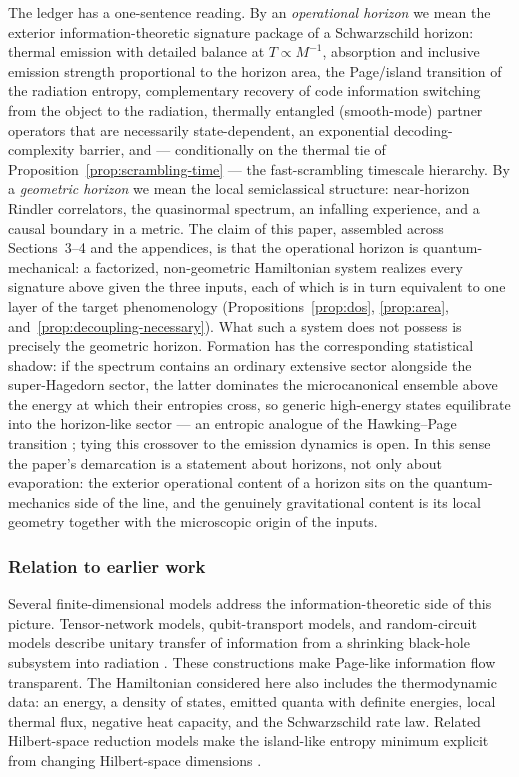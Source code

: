 \documentclass[12pt]{article}
\begin{document}
The ledger has a one-sentence reading.  By an \emph{operational horizon}
we mean the exterior information-theoretic signature package of a
Schwarzschild horizon: thermal emission with detailed balance at
$T\propto M^{-1}$, absorption and inclusive emission strength
proportional to the horizon area, the Page/island transition of the
radiation entropy, complementary recovery of code information switching
from the object to the radiation, thermally entangled (smooth-mode)
partner operators that are necessarily state-dependent, an exponential
decoding-complexity barrier, and --- conditionally on the thermal tie of
Proposition~\ref{prop:scrambling-time} --- the fast-scrambling timescale
hierarchy.  By a \emph{geometric horizon} we mean the local
semiclassical structure: near-horizon Rindler correlators, the
quasinormal spectrum, an infalling experience, and a causal boundary in
a metric.  The claim of this paper, assembled across Sections~3--4 and
the appendices, is that the operational horizon is quantum-mechanical: a
factorized, non-geometric Hamiltonian system realizes every signature
above given the three inputs, each of which is in turn equivalent to one
layer of the target phenomenology (Propositions~\ref{prop:dos},
\ref{prop:area}, and~\ref{prop:decoupling-necessary}).  What such a
system does not possess is precisely the geometric horizon.  Formation
has the corresponding statistical shadow: if the spectrum contains an
ordinary extensive sector alongside the super-Hagedorn sector, the
latter dominates the microcanonical ensemble above the energy at which
their entropies cross, so generic high-energy states equilibrate into
the horizon-like sector --- an entropic analogue of the Hawking--Page
transition \cite{HawkingPage1983}; tying this crossover to the emission
dynamics is open.  In this sense the paper's demarcation is a statement
about horizons, not only about evaporation: the exterior operational
content of a horizon sits on the quantum-mechanics side of the line,
and the genuinely gravitational content is its local geometry together
with the microscopic origin of the inputs.

\subsubsection*{Relation to earlier work}

Several finite-dimensional models address the information-theoretic side of
this picture.  Tensor-network models, qubit-transport models, and random-circuit
models describe unitary transfer of information from a shrinking black-hole
subsystem into radiation \cite{LeutheusserVanRaamsdonk2017,Avery2013,
OsugaPage2018,PiroliSunderhaufQi2020}.  These constructions make Page-like
information flow transparent.  The Hamiltonian considered here also includes the
thermodynamic data: an energy, a density of states, emitted quanta with
definite energies, local thermal flux, negative heat capacity, and the
Schwarzschild rate law.  Related Hilbert-space reduction models make the
island-like entropy minimum explicit from changing Hilbert-space dimensions
\cite{BasuWenZhou2025}.
\end{document}
